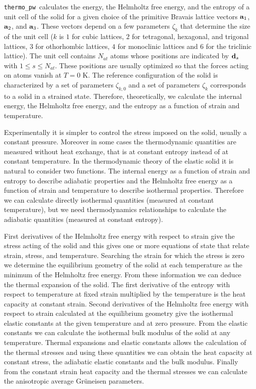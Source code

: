 \documentclass[12pt,a4paper]{article}
\def\tpw{\texttt{thermo\_pw}}
\begin{document}
\tpw\ calculates the energy, the Helmholtz free energy, and the
entropy of a unit cell of the solid for a given choice of the primitive 
Bravais lattice vectors ${\bf a}_1$, ${\bf a}_2$, and ${\bf a}_3$. These
vectors depend on a few parameters $\zeta_k$ that determine the size 
of the unit cell ($k$ is $1$ for cubic lattices, $2$ for tetragonal, hexagonal,
and trigonal lattices, $3$ for othorhombic lattices, $4$ for monoclinic
lattices and $6$ for the triclinic lattice).
The unit cell contains $N_{at}$ atoms
whose positions are indicated by ${\bf d}_s$ with $1\le s\le N_{at}$.
These positions are usually optimized so that the forces acting on atoms 
vanish at $T=0$ K.
The reference configuration of the solid is
characterized by a set of parameters $\zeta_{k,0}$ and a set of parameters 
$\zeta_k$ corresponds to a solid in a strained state.
Therefore, theoretically, we calculate the 
internal energy, the Helmholtz free energy, and the entropy as a 
function of strain and temperature.

Experimentally it is simpler to control the stress imposed on the solid,
usually a constant pressure.
Moreover in some cases the thermodynamic quantities are measured without 
heat exchange, that is at constant entropy instead of at constant temperature. 
In the thermodynamic theory of the elastic solid it is natural to consider two
functions. The internal energy as a function of strain and entropy  
to describe adiabatic properties and the Helmholtz free energy as a function
of strain and temperature to describe isothermal properties.
Therefore we can calculate directly isothermal quantities (measured at constant
temperature), but we need thermodynamics relationships to calculate
the adiabatic quantities (measured at constant entropy).

First derivatives of the Helmholtz free energy with respect to strain
give the stress acting of the solid and this gives one or more equations
of state that relate strain, stress, and temperature. 
Searching the strain for which the stress is zero we determine the 
equilibrium geometry of the solid at each temperature as the minimum of 
the Helmholtz free energy. From these information we can deduce the
thermal expansion of the solid. The first derivative of the entropy 
with respect to temperature at fixed strain multiplied by the temperature
is the heat capacity at constant strain. Second derivatives of the 
Helmholtz free energy with 
respect to strain calculated at the equilibrium geometry give the 
isothermal elastic constants at the given temperature and at zero pressure. 
From the elastic constants we can calculate the isothermal bulk modulus 
of the solid at any temperature. 
Thermal expansions and elastic constants allows the calculation of the thermal
stresses and using these quantities we can obtain the heat capacity at
constant stress, the adiabatic elastic constants and the bulk modulus.
Finally from the constant strain heat capacity and the thermal stresses 
we can calculate the anisotropic average Gr\"uneisen parameters.
\end{document}
